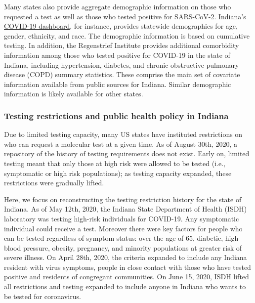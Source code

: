 \documentclass[12pt]{amsart}
\numberwithin{equation}{section}
\theoremstyle{plain}
\begin{document}
Many states also provide aggregate demographic information on those who requested a test as well as those who tested positive for SARS-CoV-2. Indiana's \href{https://www.coronavirus.in.gov/2393.htm}{COVID-19 dashboard}, for instance, provides statewide demographics for age, gender, ethnicity, and race.  The demographic information is based on cumulative testing.  In addition, the Regenstrief Institute provides additional comorbidity information among those who tested positive for COVID-19 in the state of Indiana, including hypertension, diabetes, and chronic obstructive pulmonary disease (COPD) summary statistics. These comprise the main set of covariate information available from public sources for Indiana. Similar demographic information is likely available for other states.
%




\subsubsection{Testing restrictions and public health policy in Indiana}

Due to limited testing capacity, many US states have instituted restrictions on who can request a molecular test at a given time.
As of August 30th, 2020, a repository of the history of testing requirements does not exist.  Early on, limited testing meant that only those at high risk were allowed to be tested (i.e., symptomatic or high risk populations); as testing capacity expanded, these restrictions were gradually lifted.

Here, we focus on reconstructing the testing restriction history for the state of Indiana. As of May 12th, 2020, the Indiana State Department of Health (ISDH) laboratory was testing high-risk individuals for COVID-19. Any symptomatic individual could receive a test.  Moreover there were key factors for people who can be tested regardless of symptom status: over the age of 65, diabetic, high-blood pressure, obesity, pregnancy, and minority populations at greater risk of severe illness.
On April 28th, 2020, the criteria expanded to include any Indiana resident with virus symptoms, people in close contact with those who have tested positive and residents of congregant communities.
On June 15, 2020, ISDH lifted all restrictions and testing expanded to include anyone in Indiana who wants to be tested for coronavirus.
\end{document}
